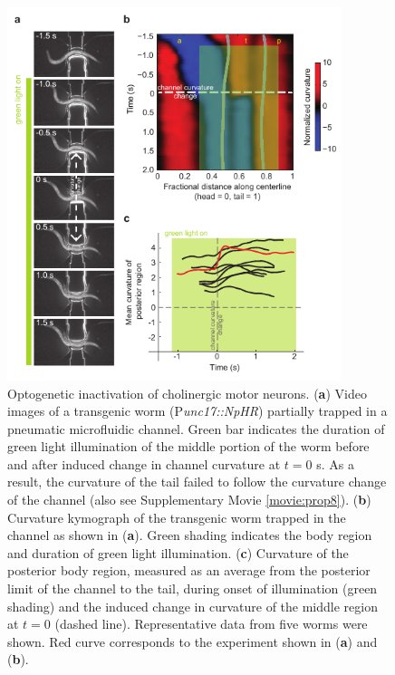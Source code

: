 \begin{figure} 
\includegraphics[width=0.87\textwidth]{figures/prop4}
\caption[ Optogenetic inactivation of cholinergic motor neurons.] { Optogenetic inactivation of cholinergic motor neurons.   
(\textbf{a}) Video images of a transgenic worm (P\textit{unc17::NpHR}) partially trapped in a pneumatic 
microfluidic channel. Green bar indicates the duration of green light illumination of the middle 
portion of the worm before and after induced change in channel curvature at $t = 0$ s. As a result, 
the curvature of the tail failed to follow the curvature change of the channel (also see 
Supplementary Movie  \ref{movie:prop8}). 
(\textbf{b}) Curvature kymograph of the transgenic worm trapped in the channel as shown in (\textbf{a}). Green 
shading indicates the body region and duration of green light illumination. 
(\textbf{c}) Curvature of the posterior body region, measured as an average from the posterior limit of the 
channel to the tail, during onset of illumination (green shading) and the induced change in 
curvature of the middle region at $t = 0$ (dashed line). Representative data from five worms were 
shown. Red curve corresponds to the experiment shown in (\textbf{a}) and (\textbf{b}). 
\label{fig:prop4}}
\end{figure}

